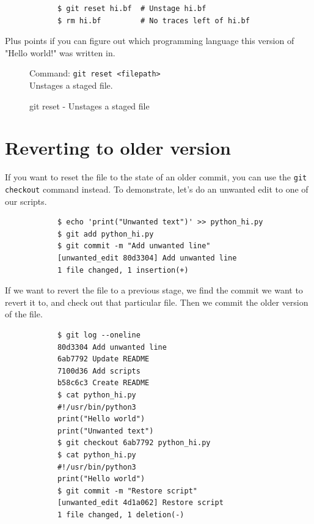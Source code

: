 \documentclass[../main/git_course_main.tex]{subfiles}
\begin{document}
	\begin{codebox}
		\begin{lstlisting}
			$ git reset hi.bf  # Unstage hi.bf
			$ rm hi.bf         # No traces left of hi.bf
		\end{lstlisting}
	\end{codebox}
	
	Plus points if you can figure out which programming language this version
	of "Hello world!" was written in.
	
	\begin{figure}[h!]
		\begin{bluebox}
			Command: \verb$git reset <filepath>$ \\
			
			Unstages a staged file.
		\end{bluebox}
		\label{command:reset}
		\caption{git reset - Unstages a staged file}
	\end{figure}
	
	\section{Reverting to older version}
	
	If you want to reset the file to the state of an older commit, you can use the \verb$git checkout$ command instead. To demonstrate, let's do an unwanted edit to one of our scripts.
	
	\begin{codebox}
		\begin{lstlisting}
			$ echo 'print("Unwanted text")' >> python_hi.py
			$ git add python_hi.py
			$ git commit -m "Add unwanted line"
			[unwanted_edit 80d3304] Add unwanted line
			1 file changed, 1 insertion(+)
		\end{lstlisting}
	\end{codebox}
	
	If we want to revert the file to a previous stage, we find the commit we want to revert it to, and check out that particular file. Then we commit the older version of the file.
	
	\begin{codebox}
		\begin{lstlisting}
			$ git log --oneline
			80d3304 Add unwanted line
			6ab7792 Update README
			7100d36 Add scripts
			b58c6c3 Create README
			$ cat python_hi.py
			#!/usr/bin/python3
			print("Hello world")
			print("Unwanted text")
			$ git checkout 6ab7792 python_hi.py
			$ cat python_hi.py
			#!/usr/bin/python3
			print("Hello world")
			$ git commit -m "Restore script"
			[unwanted_edit 4d1a062] Restore script
			1 file changed, 1 deletion(-)
		\end{lstlisting}
	\end{codebox}
	
\end{document}
